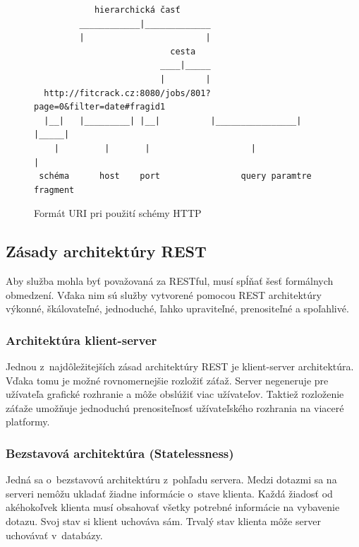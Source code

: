 \documentclass[slovak]{fitthesis}
\begin{document}
\begin{figure}[H]
\begin{center}
\begin{varwidth}{\linewidth}
\begin{verbatim}
            hierarchická časť
         ____________|_____________                  
         |                        |
                           cesta
                         ____|_____
                         |        |
  http://fitcrack.cz:8080/jobs/801?page=0&filter=date#fragid1
  |__|   |_________| |__|          |________________| |_____|
    |         |       |                    |               |
 schéma      host    port                query paramtre  fragment

\end{verbatim}
\end{varwidth}
\end{center}
\caption{Formát URI pri použití schémy HTTP}
\label{fig:formatURI}
\end{figure}



\subsection{Zásady architektúry REST} \label{zasadyREST}
Aby služba mohla byť považovaná za RESTful, musí spĺňať šesť formálnych obmedzení. Vďaka nim sú služby vytvorené pomocou REST architektúry výkonné, škálovateľné, jednoduché, ľahko upraviteľné, prenositeľné a spoľahlivé.

\subsubsection{Architektúra klient-server}
Jednou z~najdôležitejších zásad architektúry REST je klient-server architektúra. Vďaka tomu je možné rovnomernejšie rozložiť záťaž. Server negeneruje pre užívateľa grafické rozhranie a môže obslúžiť viac užívateľov. Taktiež rozloženie záťaže umožňuje jednoduchú prenositeľnosť užívateľského rozhrania na viaceré platformy.

\subsubsection{Bezstavová architektúra (Statelessness)}
Jedná sa o~bezstavovú architektúru z~pohľadu servera. Medzi dotazmi sa na serveri nemôžu ukladať žiadne informácie o~stave klienta. Každá žiadosť od akéhokoľvek klienta musí obsahovať všetky potrebné informácie na vybavenie dotazu. Svoj stav si klient uchováva sám. Trvalý stav klienta môže server uchovávať v~databázy.
\end{document}

